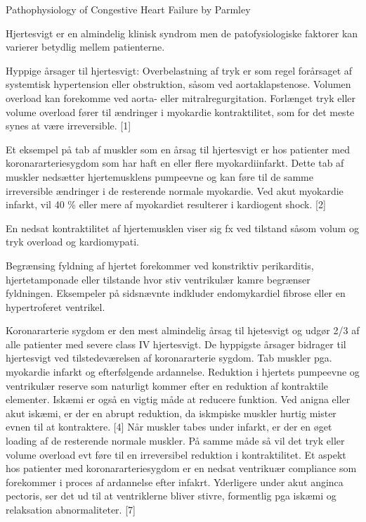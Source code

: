 Pathophysiology of Congestive Heart Failure by Parmley

Hjertesvigt er en almindelig klinisk syndrom men de patofysiologiske faktorer kan varierer betydlig mellem patienterne. 

Hyppige årsager til hjertesvigt:
Overbelastning af tryk er som regel forårsaget af systemtisk hypertension eller obstruktion, såsom ved aortaklapstenose. Volumen overload kan forekomme ved aorta- eller mitralregurgitation.  Forlænget tryk eller volume overload fører til ændringer i myokardie kontraktilitet, som for det meste synes at være irreversible. [1]

Et eksempel på tab af muskler som en årsag til hjertesvigt er hos patienter med koronararteriesygdom som har haft en eller flere myokardiinfarkt. Dette tab af muskler nedsætter hjertemusklens pumpeevne og kan føre til de samme irreversible ændringer i de resterende normale myokardie. Ved akut myokardie infarkt, vil 40 \% eller mere af myokardiet resulterer i kardiogent shock. [2]

En nedsat kontraktilitet af hjertemusklen viser sig fx ved tilstand såsom volum og tryk overload og kardiomypati.

Begrænsing fyldning af hjertet forekommer ved konstriktiv perikarditis, hjertetamponade eller tilstande hvor stiv ventrikulær kamre begrænser fyldningen. Eksempeler på sidsnævnte indkluder endomykardiel fibrose eller en hypertroferet ventrikel. 

Koronararterie sygdom er den mest almindelig årsag til hjetesvigt og udgør 2/3 af alle patienter med severe class IV hjertesvigt. De hyppigste årsager bidrager til hjertesvigt ved tilstedeværelsen af koronararterie sygdom. Tab muskler pga. myokardie infarkt og efterfølgende ardannelse. Reduktion i hjertets pumpeevne og ventrikulær reserve som naturligt kommer efter en reduktion af kontraktile elementer. Iskæmi er også en vigtig måde at reducere funktion. Ved anigna eller akut iskæmi, er der en abrupt reduktion, da iskmpiske muskler hurtig mister evnen til at kontraktere. [4] Når muskler tabes under infarkt, er der en øget loading af de resterende normale muskler. På samme måde så vil det tryk eller volume overload evt føre til en irreversibel reduktion i kontraktilitet. Et aspekt hos patienter med koronararteriesygdom er en nedsat ventrikuær compliance som forekommer i proces af ardannelse efter infakrt. Yderligere under akut anginca pectoris, ser det ud til at ventriklerne bliver stivre, formentlig pga iskæmi og relaksation abnormaliteter. [7]

